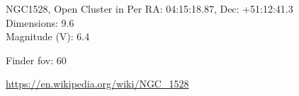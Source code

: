 \begin{block}{NGC1528, Open Cluster in Per}
    RA: 04:15:18.87, Dec: +51:12:41.3 \\ 
    Dimensions: 9.6 \\ 
    Magnitude (V): 6.4



    Finder fov: 60 

    \url{https://en.wikipedia.org/wiki/NGC_1528} 
\end{block}